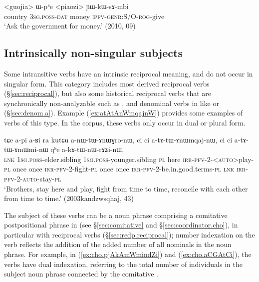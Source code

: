 \begin{exe}
\ex   \label{ex:Wphe.piaozi}
 \gll <guojia> ɯ-pʰe <piaozi> ɲɯ-kɯ-sɤ-mbi \\
country \textsc{3sg}.\textsc{poss}-\textsc{dat} money \textsc{ipfv}-\textsc{genr}:S/O-\textsc{rog}-give \\
\glt `Ask the government for money.' (2010, 09)
\end{exe}

\subsection{Intrinsically non-singular subjects} \label{sec:intrinsically.n.sg.subject}
Some intransitive verbs have an intrinsic reciprocal meaning, and do not occur in singular form. This category includes most derived reciprocal verbs (§\ref{sec:reciprocal}), but also some historical reciprocal verbs that are synchronically non-analyzable such as , and denominal verbs in  like  or  (§\ref{sec:denom.a}). Example (\ref{ex:atAtAnWmqajnW}) provides some examples of verbs of this type. In the corpus, these verbs only occur in dual or plural form.

\begin{exe}
\ex   \label{ex:atAtAnWmqajnW}
 \gll tɕe a-pi a-ʁi ra kutɕu a-nɯ-tɯ-ɤnɯɣro-nɯ, ci ci a-tɤ-tɯ-ɤnɯmqaj-nɯ, ci ci a-tɤ-tɯ-ɤmɯmi-nɯ qʰe a-kɤ-tɯ-nɯ-rɤʑi-nɯ, \\
\textsc{lnk} \textsc{1sg}.\textsc{poss}-elder.sibling  \textsc{1sg}.\textsc{poss}-younger.sibling \textsc{pl}  here \textsc{irr}-\textsc{pfv}-2-<\textsc{auto}>play-\textsc{pl} once once \textsc{irr}-\textsc{pfv}-2-fight-\textsc{pl} once once \textsc{irr}-\textsc{pfv}-2-be.in.good.terms-\textsc{pl} \textsc{lnk} \textsc{irr}-\textsc{pfv}-2-\textsc{auto}-stay-\textsc{pl}\\
\glt `Brothers, stay here and play, fight from time to time, reconcile with each other from time to time.' (2003kandzwsqhaj, 43)
\end{exe}

The subject of these verbs can be a noun phrase comprising a comitative postpositional phrase in  (see §\ref{sec:comitative} and §\ref{sec:coordinator.cho}), in particular with reciprocal verbs (§\ref{sec:redp.reciprocal}); number indexation on the verb reflects the addition of the added number of all nominals in the noun phrase. For example, in (\ref{ex:cho.pjAkAmWmindZi}) and (\ref{ex:cho.aCGAtCi}), the verbs have dual indexation, referring to the total number of individuals in the subject noun phrase connected by the comitative .

